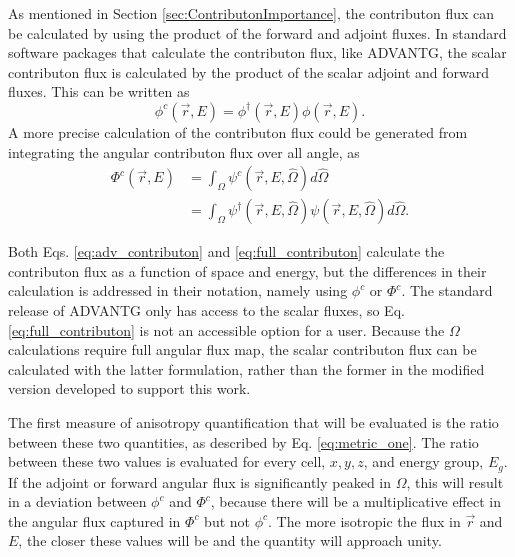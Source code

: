 As mentioned in Section \ref{sec:ContributonImportance}, the
contributon flux can be calculated by using
the product of the forward and adjoint fluxes. In standard software packages
that calculate the contributon flux, like ADVANTG, the scalar contributon flux is calculated by the product
of the scalar adjoint and forward fluxes. This can be written as
%
\begin{equation}
  \phi^{c}(\vec {r} ,E)  = \phi^{\dagger}(\vec {r} ,E)\phi(\vec {r} ,E) .
\label{eq:adv_contributon}
\end{equation}
%
A more precise calculation of the contributon flux could be generated from
integrating the angular contributon flux over all angle, as
%
\begin{equation}
  \begin{split}
    \Phi^{c}(\vec {r} ,E)  & = \int_{\Omega}{\psi^{c}(\vec{r}, E, \hat \Omega)}
                               d\hat\Omega \\
             & = \int_{\Omega}{\psi^{\dagger}(\vec{r}, E, \hat\Omega)
                 \psi(\vec{r}, E, \hat\Omega)} d\hat\Omega .
  \end{split}
\label{eq:full_contributon}
\end{equation}

Both Eqs. \eqref{eq:adv_contributon} and \eqref{eq:full_contributon} calculate
the contributon flux as a function of space and energy, but the
differences in their calculation is addressed in their notation, namely using
$\phi^{c}$ or $\Phi^{c}$. The standard release of ADVANTG only has
access to the scalar
fluxes, so Eq. \eqref{eq:full_contributon} is not an accessible option for a
user. Because the $\Omega$ calculations require full angular flux map,
the scalar contributon flux can be calculated with the latter
formulation, rather than the former in the modified version developed to support
this work.

The first measure of anisotropy quantification that will be evaluated is the
ratio between these two quantities, as described by Eq. \eqref{eq:metric_one}.
The ratio between these two values is evaluated for every cell, $x,y,z$, and energy
group, $E_g$.
If the adjoint or forward angular flux is significantly
peaked in $\Omega$, this will result in a deviation between $\phi^{c}$ and
$\Phi^{c}$, because there will be a multiplicative effect in the angular flux
captured in $\Phi^{c}$ but not $\phi^{c}$. The more isotropic the
flux in $\vec{r}$ and $E$, the closer these
values will be and the quantity will approach unity.

